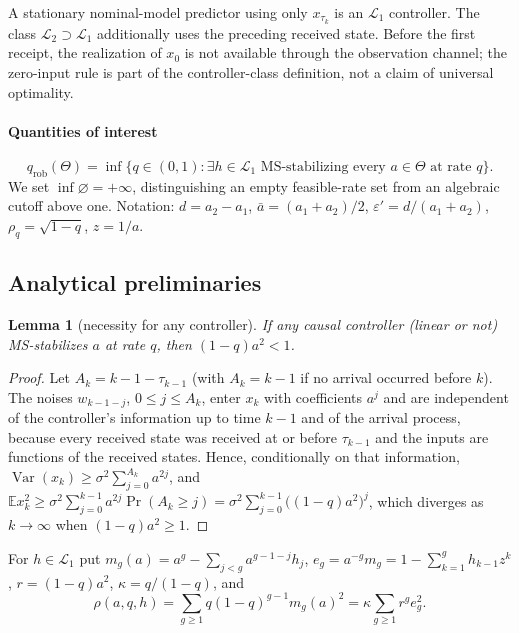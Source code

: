 \documentclass[preprint,12pt,numbers]{elsarticle}
\newtheorem{lemma}{Lemma}
\theoremstyle{definition}
\newcommand{\E}{\mathbb{E}}
\newcommand{\Lone}{\mathcal{L}_1}
\newcommand{\Ltwo}{\mathcal{L}_2}
\newcommand{\abar}{\bar a}
\newcommand{\qrob}{q_{\mathrm{rob}}}
\begin{document}
A stationary nominal-model predictor using only $x_{\tau_k}$ is an
$\Lone$ controller. The class $\Ltwo\supset\Lone$ additionally uses
the preceding received state. Before the first receipt, the
realization of $x_0$ is not available through the observation channel;
the zero-input rule is part of the controller-class definition,
not a claim of universal optimality.


\paragraph{Quantities of interest}
\[\qrob(\Theta)=\inf\{q\in(0,1):\exists h\in\Lone\text{ MS-stabilizing every }a\in\Theta\text{ at rate }q\}.\]
We set $\inf\varnothing=+\infty$, distinguishing an empty feasible-rate set from an algebraic cutoff above one. Notation: $d=a_2-a_1$, $\abar=(a_1+a_2)/2$, $\varepsilon'=d/(a_1+a_2)$, $\rho_q=\sqrt{1-q}$, $z=1/a$.

\subsection{Analytical preliminaries}

\begin{lemma}[necessity for any controller]\label{lem:any}
If any causal controller (linear or not) MS-stabilizes $a$ at rate $q$, then $(1-q)a^2<1$.
\end{lemma}
\begin{proof}
Let $A_k=k-1-\tau_{k-1}$ (with $A_k=k-1$ if no arrival occurred before $k$). The noises $w_{k-1-j}$, $0\le j\le A_k$, enter $x_k$ with coefficients $a^j$ and are independent of the controller's information up to time $k-1$ and of the arrival process, because every received state was received at or before $\tau_{k-1}$ and the inputs are functions of the received states. Hence, conditionally on that information, $\operatorname{Var}(x_k)\ge\sigma^2\sum_{j=0}^{A_k}a^{2j}$, and $\E x_k^2\ge\sigma^2\sum_{j=0}^{k-1}a^{2j}\Pr(A_k\ge j)=\sigma^2\sum_{j=0}^{k-1}\bigl((1-q)a^2\bigr)^j$, which diverges as $k\to\infty$ when $(1-q)a^2\ge1$.
\end{proof}

For $h\in\Lone$ put $m_g(a)=a^g-\sum_{j<g}a^{g-1-j}h_j$, $e_g=a^{-g}m_g=1-\sum_{k=1}^g h_{k-1}z^k$, $r=(1-q)a^2$, $\kappa=q/(1-q)$, and
\begin{equation}\label{eq:rho}
\rho(a,q,h)=\sum_{g\ge1}q(1-q)^{g-1}m_g(a)^2=\kappa\sum_{g\ge1}r^g e_g^2 .
\end{equation}
\end{document}
